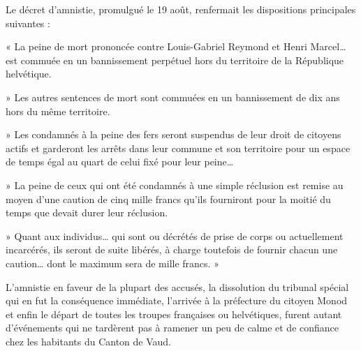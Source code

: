\documentclass[french,twoside]{book} %
\newenvironment{quoteblock}%
  {\begin{quoting}}
  {\end{quoting}}
\newenvironment{quotebar}{%
    \def\FrameCommand{{\color{rubric!10!}\vrule width 0.5em} \hspace{0.9em}}%
    \def\OuterFrameSep{\itemsep} %
    \MakeFramed {\advance\hsize-\width \FrameRestore}
  }%
  {%
    \endMakeFramed
  }
\renewenvironment{quoteblock}%
  {%
    \savenotes
    \setstretch{0.9}
    \begin{quotebar}
  }
  {%
    \end{quotebar}
    \spewnotes
  }
\begin{document}
\noindent Le décret d’amnistie, promulgué le 19 août, renfermait les dispositions principales suivantes :\par

\begin{quoteblock}
 \noindent « La peine de mort prononcée contre Louis-Gabriel Reymond et Henri Marcel… est commuée en un bannissement perpétuel hors du territoire de la République helvétique.\par
 » Les autres sentences de mort sont commuées en un bannissement de dix ans hors du même territoire.\par
 » Les condamnés à la peine des fers seront suspendus de leur droit de citoyens actifs et garderont les arrêts dans leur commune et son territoire pour un espace de temps égal au quart de celui fixé pour leur peine…\par
 » La peine de ceux qui ont été condamnés à une simple réclusion est remise au moyen d’une caution de cinq mille francs qu’ils fourniront pour la moitié du temps que devait durer leur réclusion.\par
 » Quant aux individus… qui sont ou décrétés de prise de corps ou actuellement incarcérés, ils seront de suite libérés, à charge toutefois de fournir chacun une caution… dont le maximum sera de mille francs. »
 \end{quoteblock}

\noindent L’amnistie en faveur de la plupart des accusés, la dissolution du tribunal spécial qui en fut la conséquence immédiate, l’arrivée à la préfecture du citoyen Monod et enfin le départ de toutes les troupes françaises ou helvétiques, furent autant d’événements qui ne tardèrent pas à ramener un peu de calme et de confiance chez les habitants du Canton de Vaud.
\end{document}
